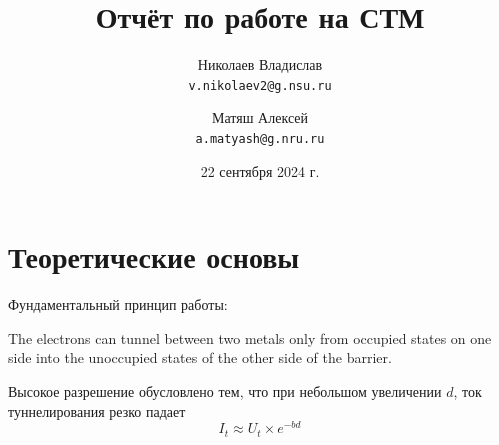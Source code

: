 \documentclass{article}
\title{Отчёт по работе на СТМ}
\author{Николаев Владислав\\
\texttt{v.nikolaev2@g.nsu.ru} \and
Матяш Алексей\\
\texttt{a.matyash@g.nru.ru}}
\date{22 сентября 2024 г.}
\begin{document}
\maketitle
\section{Теоретические основы}
Фундаментальный принцип работы:
\begin{figure}[h]

	\centering
\end{figure}

\begin{displayquote}
	The electrons can tunnel between two metals only from occupied states on one side into the unoccupied states of the other side of the barrier.
\end{displayquote}
Высокое разрешение обусловлено тем, что при небольшом увеличении $d$, ток туннелирования резко падает
$$I_t \approx U_t \times e^{-bd}$$
\end{document}
